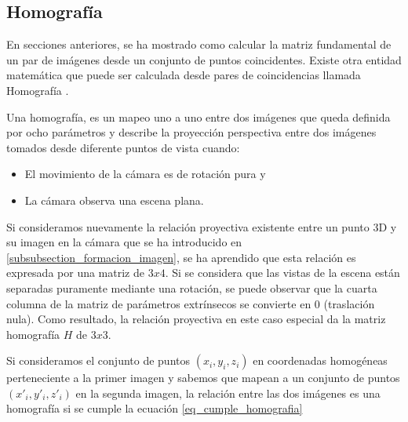\documentclass[a4paper,11pt,spanish]{article}
\begin{document}

\subsection{Homografía}
En secciones anteriores, se ha mostrado como calcular la matriz fundamental de un par de imágenes desde un conjunto de puntos coincidentes. Existe otra entidad matemática que puede ser calculada desde pares de coincidencias llamada Homografía \cite{citeulike:9456628, bb38231}. 

Una homografía, es un mapeo uno a uno entre dos imágenes que queda definida por ocho parámetros y describe la proyección perspectiva entre dos imágenes tomados desde diferente puntos de vista cuando:
\begin{itemize}
  \item El movimiento de la cámara es de rotación pura y 
  \item La cámara observa una escena plana.
\end{itemize}

Si consideramos nuevamente la relación proyectiva existente entre un punto 3D y su imagen en la cámara que se ha introducido en \ref{subsubsection_formacion_imagen}, se ha aprendido que esta relación es expresada por una matriz de $3x4$. Si se considera que las vistas de la escena están separadas puramente mediante una rotación, se puede observar que la cuarta columna de la matriz de parámetros extrínsecos se convierte en 0 (traslación nula). Como resultado, la relación proyectiva en este caso especial da la matriz homografía $H$ de $3x3$. 

Si consideramos el conjunto de puntos $(x_i,y_i,z_i)$ en coordenadas homogéneas perteneciente a la primer imagen y sabemos que mapean a un conjunto de puntos $(x'_i, y'_i, z'_i)$ en la segunda imagen, la relación entre las dos imágenes es una homografía si se cumple la ecuación \eqref{eq_cumple_homografia}
\end{document}
